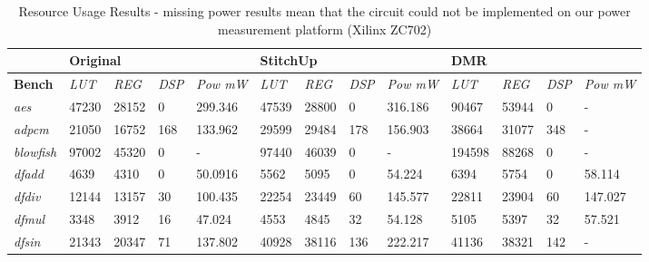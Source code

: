 \begin{table}[t]
\small
\singlespace
\centering
\caption{Resource Usage Results - missing power results mean that the circuit could not be implemented on our power measurement platform (Xilinx ZC702)}
\label{tab:resources}
\tabcolsep=0.11cm
\begin{tabular}{@{}|l|l|l|l|l|l|l|l|l|l|l|l|l|@{}}
\toprule
                    & \multicolumn{4}{l|}{\textbf{Original}}                      & \multicolumn{4}{l|}{\textbf{StitchUp}}                      & \multicolumn{4}{l|}{\textbf{DMR}}                           \\ \midrule
\textbf{Bench}      & \textit{LUT} & \textit{REG} & \textit{DSP} &\textit{Pow mW} & \textit{LUT} & \textit{REG} & \textit{DSP} &\textit{Pow mW}& \textit{LUT} & \textit{REG} & \textit{DSP} & \textit{Pow mW}   \\ \midrule
\textit{aes}        & 47230        & 28152        & 0            & 299.346        & 47539        & 28800        & 0            & 316.186        & 90467        & 53944        & 0            & -              \\ \midrule
\textit{adpcm}      & 21050        & 16752        & 168          & 133.962        & 29599        & 29484        & 178          & 156.903        & 38664        & 31077        & 348          & -              \\ \midrule
\textit{blowfish}   & 97002        & 45320        & 0            & -              & 97440        & 46039        & 0            & -              & 194598       & 88268        & 0            & -              \\ \midrule
\textit{dfadd}      & 4639         & 4310         & 0            & 50.0916        & 5562         & 5095         & 0            & 54.224         & 6394         & 5754         & 0            & 58.114         \\ \midrule
\textit{dfdiv}      & 12144        & 13157        & 30           & 100.435        & 22254        & 23449        & 60           & 145.577        & 22811        & 23904        & 60           & 147.027        \\ \midrule
\textit{dfmul}      & 3348         & 3912         & 16           & 47.024         & 4553         & 4845         & 32           & 54.128         & 5105         & 5397         & 32           & 57.521         \\ \midrule
\textit{dfsin}      & 21343        & 20347        & 71           & 137.802        & 40928        & 38116        & 136          & 222.217        & 41136        & 38321        & 142          & -              \\ \midrule

\end{tabular}
\end{table}
